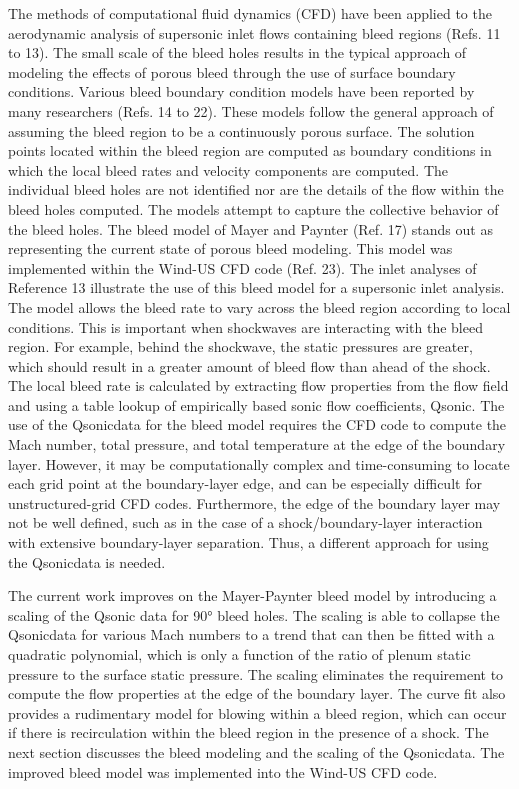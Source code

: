 The methods of computational fluid dynamics (CFD) have been applied to the aerodynamic analysis of supersonic inlet flows containing bleed regions (Refs. 11 to 13). The small scale of the bleed holes results in the typical approach of modeling the effects of porous bleed through the use of surface boundary conditions. Various bleed boundary condition models have been reported by many researchers (Refs. 14 to 22). These models follow the general approach of assuming the bleed region to be a continuously porous surface. The solution points located within the bleed region are computed as boundary conditions in which the local bleed rates and velocity components are computed. The individual bleed holes are not identified nor are the details of the flow within the bleed holes computed. The models attempt to capture the collective behavior of the bleed holes.
The bleed model of Mayer and Paynter (Ref. 17) stands out as representing the current state of porous bleed modeling. This model was implemented within the Wind-US CFD code (Ref. 23). The inlet analyses of Reference 13 illustrate the use of this bleed model for a supersonic inlet analysis. The model allows the bleed rate to vary across the bleed region according to local conditions. This is important when shockwaves are interacting with the bleed region. For example, behind the shockwave, the static pressures are greater, which should result in a greater amount of bleed flow than ahead of the shock. The local bleed rate is calculated by extracting flow properties from the flow field and using a table lookup of empirically based sonic flow coefficients, Qsonic. The use of the Qsonicdata for the bleed model requires the CFD code to compute the Mach number, total pressure, and total temperature at the edge of the boundary layer. However, it may be computationally complex and time-consuming to locate each grid point at the boundary-layer edge, and can be especially difficult for unstructured-grid CFD codes. Furthermore, the edge of the boundary layer may not be well defined, such as in the case of a shock/boundary-layer interaction with extensive boundary-layer separation. Thus, a different approach for using the Qsonicdata is needed.

The current work improves on the Mayer-Paynter bleed model by introducing a scaling of the Qsonic data for 90° bleed holes. The scaling is able to collapse the Qsonicdata for various Mach numbers to a trend that can then be fitted with a quadratic polynomial, which is only a function of the ratio of plenum static pressure to the surface static pressure. The scaling eliminates the requirement to compute the flow properties at the edge of the boundary layer. The curve fit also provides a rudimentary model for blowing within a bleed region, which can occur if there is recirculation within the bleed region in the presence of a shock. The next section discusses the bleed modeling and the scaling of the Qsonicdata. The improved bleed model was implemented into the Wind-US CFD code.

